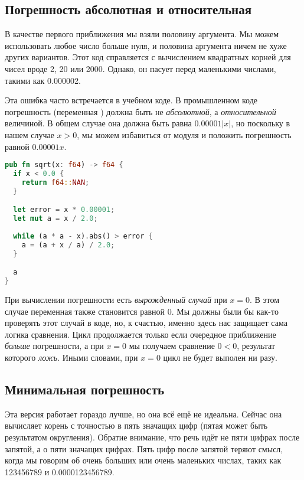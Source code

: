 \subsection{Погрешность абсолютная и относительная}

В качестве первого приближения мы взяли половину аргумента.
Мы можем использовать любое число больше нуля, и половина аргумента ничем не хуже других вариантов.
Этот код справляется с вычислением квадратных корней для чисел вроде 2, 20 или 2000.
Однако, он пасует перед маленькими числами, такими как 0.000002.

Эта ошибка часто встречается в учебном коде.
В промышленном коде погрешность (переменная ) должна быть не {\em абсолютной}, а {\em относительной} величиной.
В общем случае она должна быть равна $0.00001 |x|$, но поскольку в нашем случае $x > 0$, мы можем избавиться от модуля и положить погрешность равной $0.00001 x$.

\begin{lstlisting}[language=Rust]
pub fn sqrt(x: f64) -> f64 {
  if x < 0.0 {
    return f64::NAN;
  }

  let error = x * 0.00001;
  let mut a = x / 2.0;
  
  while (a * a - x).abs() > error {
    a = (a + x / a) / 2.0;
  }

  a
}
\end{lstlisting}

При вычислении погрешности есть {\em вырожденный случай} при $x = 0$.
В этом случае переменная  также становится равной 0.
Мы должны были бы как-то проверять этот случай в коде, но, к счастью, именно здесь нас защищает сама логика сравнения.
Цикл продолжается только если очередное приближение {\em больше} погрешности, а при $x = 0$ мы получаем сравнение $0 < 0$, результат которого {\em ложь}.
Иными словами, при $x = 0$ цикл не будет выполен ни разу.

\subsection{Минимальная погрешность}

Эта версия работает гораздо лучше, но она всё ещё не идеальна.
Сейчас она вычисляет корень с точностью в пять значащих цифр (пятая может быть результатом округления).
Обратие внимание, что речь идёт не пяти цифрах после запятой, а о пяти значащих цифрах.
Пять цифр после запятой теряют смысл, когда мы говорим об очень больших или очень маленьких числах, таких как 123456789 и 0.0000123456789.


